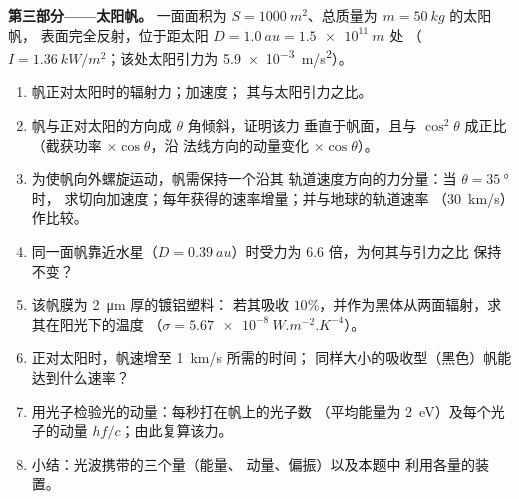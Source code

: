 \begin{problem}
\medskip
\noindent\textbf{第三部分——太阳帆。}
一面面积为 $S = \qty{1000}{m^2}$、总质量为 $m = \qty{50}{kg}$ 的太阳帆，
表面完全反射，位于距太阳 $D = \qty{1.0}{au} = \qty{1.5e11}{m}$ 处
（$I = \qty{1.36}{kW/m^2}$；该处太阳引力为 \qty{5.9e-3}{m/s^2}）。
\begin{enumerate}[resume]
  \item 帆正对太阳时的辐射力；加速度；
        其与太阳引力之比。
  \item 帆与正对太阳的方向成 $\theta$ 角倾斜，证明该力
        垂直于帆面，且与 $\cos^2\theta$ 成正比
        （截获功率 $\times\cos\theta$，沿
        法线方向的动量变化 $\times\cos\theta$）。
  \item 为使帆向外螺旋运动，帆需保持一个沿其
        轨道速度方向的力分量：当 $\theta = \qty{35}{\degree}$ 时，
        求切向加速度；每年获得的速率增量；并与地球的轨道速率
        （\qty{30}{km/s}）作比较。
  \item 同一面帆靠近水星（$D = \qty{0.39}{au}$）时受力为
        $6.6$ 倍，为何其与引力之比
        保持不变？
  \item 该帆膜为 \qty{2}{\micro m} 厚的镀铝塑料：
        若其吸收 $10\%$，并作为黑体从两面辐射，求其在阳光下的温度
        （$\sigma = \qty{5.67e-8}{W.m^{-2}.K^{-4}}$）。
  \item 正对太阳时，帆速增至 \qty{1}{km/s} 所需的时间；
        同样大小的吸收型（黑色）帆能达到什么速率？
  \item 用光子检验光的动量：每秒打在帆上的光子数
        （平均能量为 \qty{2}{eV}）及每个光子的动量
        $hf/c$；由此复算该力。
  \item 小结：光波携带的三个量（能量、
        动量、偏振）以及本题中
        利用各量的装置。
\end{enumerate}
\end{problem}
